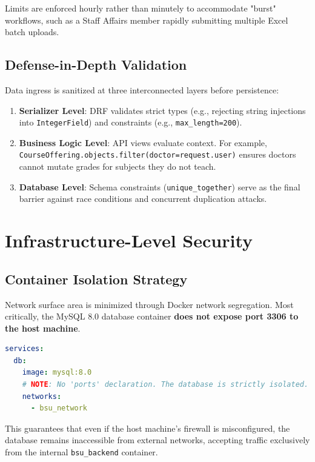 Limits are enforced hourly rather than minutely to accommodate "burst" workflows, such as a Staff Affairs member rapidly submitting multiple Excel batch uploads.

\subsection{Defense-in-Depth Validation}

Data ingress is sanitized at three interconnected layers before persistence:

\begin{enumerate}
    \item \textbf{Serializer Level}: DRF validates strict types (e.g., rejecting string injections into \texttt{IntegerField}) and constraints (e.g., \texttt{max\_length=200}).
    \item \textbf{Business Logic Level}: API views evaluate context. For example, \texttt{CourseOffering.objects.filter(doctor=request.user)} ensures doctors cannot mutate grades for subjects they do not teach.
    \item \textbf{Database Level}: Schema constraints (\texttt{unique\_together}) serve as the final barrier against race conditions and concurrent duplication attacks.
\end{enumerate}

\section{Infrastructure-Level Security}
\label{sec:infrastructure-security}

\subsection{Container Isolation Strategy}

Network surface area is minimized through Docker network segregation. Most critically, the MySQL 8.0 database container \textbf{does not expose port 3306 to the host machine}. 

\begin{lstlisting}[language=yaml, caption=Database Port Isolation (\texttt{docker-compose.yml})]
services:
  db:
    image: mysql:8.0
    # NOTE: No 'ports' declaration. The database is strictly isolated.
    networks:
      - bsu_network
\end{lstlisting}

This guarantees that even if the host machine's firewall is misconfigured, the database remains inaccessible from external networks, accepting traffic exclusively from the internal \texttt{bsu\_backend} container.

